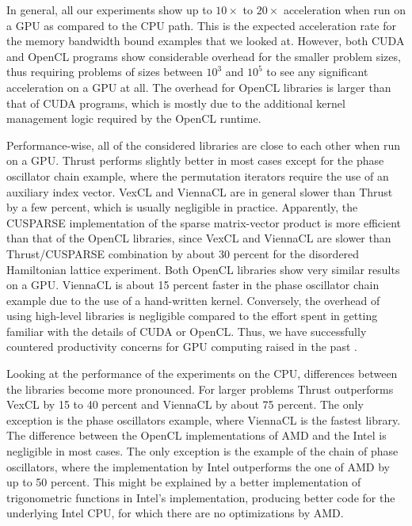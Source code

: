 \documentclass[final]{siamltex}
\begin{document}
In general, all our experiments show up to $10\times$ to $20\times$
acceleration when run on a GPU as compared to the CPU path. This is the
expected acceleration rate for the memory bandwidth bound examples that we
looked at. However, both CUDA and OpenCL programs show considerable overhead
for the smaller problem sizes, thus requiring problems of sizes between $10^3$
and $10^5$ to see any significant acceleration on a GPU at all. The overhead
for OpenCL libraries is larger than that of CUDA programs, which is mostly due
to the additional kernel management logic required by the OpenCL runtime.

Performance-wise, all of the considered libraries are close to each other when
run on a GPU.  Thrust performs slightly better in most cases except for the
phase oscillator chain example, where the permutation iterators require the use
of an auxiliary index vector.  VexCL and ViennaCL are in general slower than
Thrust by a few percent, which is usually negligible in practice.  Apparently,
the CUSPARSE implementation of the sparse matrix-vector product is more
efficient than that of the OpenCL libraries, since VexCL and ViennaCL are
slower than Thrust/CUSPARSE combination by about 30 percent for the disordered
Hamiltonian lattice experiment. Both OpenCL libraries show very similar results
on a GPU. ViennaCL is about 15 percent faster in the phase oscillator chain
example due to the use of a hand-written kernel.  Conversely, the overhead of
using high-level libraries is negligible compared to the effort spent in
getting familiar with the details of CUDA or OpenCL.  Thus, we have
successfully countered productivity concerns for GPU computing raised in the
past \cite{bordawekar:gpu-productivity}.

Looking at the performance of the experiments on the CPU, 
differences between the libraries become more pronounced. For larger problems Thrust outperforms VexCL
by 15 to 40 percent and ViennaCL by about 75 percent. The only exception is the phase oscillators
example, where ViennaCL is the fastest library. The difference
between the OpenCL implementations of AMD and the Intel is negligible in 
most cases. The only exception is the example of the chain of phase oscillators,
where the implementation by Intel outperforms the one of AMD by up to 50 percent.
This might be explained by a better implementation of trigonometric functions in Intel's implementation,
producing better code for the underlying Intel CPU, for which there are no optimizations by AMD.
\end{document}
